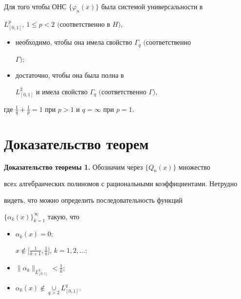  


\begin{thm} 


Для того чтобы ОНС $\{\varphi_n(x)\}$ была системой универсальности в 


$L^p_{[0,1]}$, $1{\le}p{<}2$ $($соответственно в $H),$ 


\begin{itemize} 


\item[a)] необходимо, чтобы она имела свойство $\Gamma_q$ $($соответственно 


$\Gamma);$ 


\item[б)] достаточно, чтобы она была полна в 


$L^2_{[0,1]}$ и имела свойство $\Gamma_q$ $($соответственно $\Gamma)$, 


\end{itemize} 


где $\frac{1}{q}+\frac{1}{p}=1$ при $p>1$ и $q=\infty$ при $p=1$. 


\end{thm} 


 


\section{Доказательство теорем} 


 


{\bf Доказательство теоремы 1.} Обозначим через $\{Q_n(x)\}$ множество 


всеx алгебраических полиномов с рациональными коэффициентами. Нетрудно 


видеть, что можно определить последовательность функций 


$\{\alpha_k(x)\}^\infty_{k=1}$ такую, что 


\begin{itemize} 


\item[1)] $\alpha_k(x)=0$; 


$x\notin\big[\frac{1}{k+1},\frac{1}{k}\big]$, $k=1,2,\dotsc$; 


\item[2)] $\|\alpha_k\|_{L^2_{[0,1]}}<\frac{1}{k}$; 


\item[3)] $\alpha_k(x)\notin\mathop{\cup}\limits_{q>2}L^q_{[0,1]}$. 


\end{itemize} 



